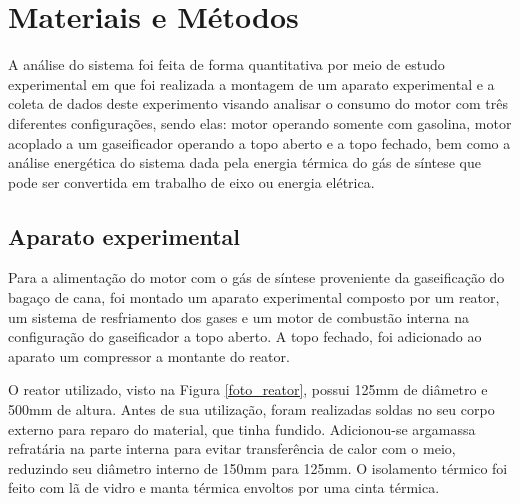 \chapter[Materiais e métodos]{Materiais e Métodos}

A análise do sistema foi feita de forma quantitativa por meio de estudo experimental em que foi realizada a montagem de um aparato experimental e a coleta de dados deste experimento visando analisar o consumo do motor com três diferentes configurações, sendo elas: motor operando somente com gasolina, motor acoplado a um gaseificador operando a topo aberto e a topo fechado, bem como a análise energética do sistema dada pela energia térmica do gás de síntese que pode ser convertida em trabalho de eixo ou energia elétrica.

\section{Aparato experimental}
Para a alimentação do motor com o gás de síntese proveniente da gaseificação do bagaço de cana, foi montado um aparato experimental composto por um reator, um sistema de resfriamento dos gases e um motor de combustão interna na configuração do gaseificador a topo aberto. A topo fechado, foi adicionado ao aparato um compressor a montante do reator.

O reator utilizado, visto na Figura \ref{foto_reator}, possui 125mm de diâmetro e 500mm de altura. Antes de sua utilização, foram realizadas soldas no seu corpo externo para reparo do material, que tinha fundido. Adicionou-se argamassa refratária na parte interna para evitar transferência de calor com o meio, reduzindo seu diâmetro interno de 150mm para 125mm. O isolamento térmico foi feito com lã de vidro e manta térmica envoltos por uma cinta térmica.

